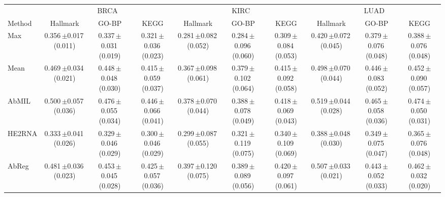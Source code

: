 
\begin{tabular}{lccccccccc}
\toprule
& \multicolumn{3}{c}{BRCA} & \multicolumn{3}{c}{KIRC} & \multicolumn{3}{c}{LUAD}\\
\cmidrule(lr){2-4}\cmidrule(lr){5-7}\cmidrule(lr){8-10}
Method & Hallmark & GO-BP & KEGG & Hallmark & GO-BP & KEGG & Hallmark & GO-BP & KEGG\\
\midrule
Max & 0.356\,{\tiny$\pm$}0.017\,{\tiny(0.011)} & 0.337\,{\tiny$\pm$}0.031\,{\tiny(0.019)} & 0.321\,{\tiny$\pm$}0.036\,{\tiny(0.023)} & 0.281\,{\tiny$\pm$}0.082\,{\tiny(0.052)} & 0.284\,{\tiny$\pm$}0.096\,{\tiny(0.060)} & 0.309\,{\tiny$\pm$}0.084\,{\tiny(0.053)} & 0.420\,{\tiny$\pm$}0.072\,{\tiny(0.045)} & 0.379\,{\tiny$\pm$}0.076\,{\tiny(0.048)} & 0.388\,{\tiny$\pm$}0.076\,{\tiny(0.048)}\\
Mean & 0.469\,{\tiny$\pm$}0.034\,{\tiny(0.021)} & 0.448\,{\tiny$\pm$}0.048\,{\tiny(0.030)} & 0.415\,{\tiny$\pm$}0.059\,{\tiny(0.037)} & 0.367\,{\tiny$\pm$}0.098\,{\tiny(0.061)} & 0.379\,{\tiny$\pm$}0.102\,{\tiny(0.064)} & 0.415\,{\tiny$\pm$}0.092\,{\tiny(0.058)} & 0.498\,{\tiny$\pm$}0.070\,{\tiny(0.044)} & 0.446\,{\tiny$\pm$}0.083\,{\tiny(0.052)} & 0.452\,{\tiny$\pm$}0.090\,{\tiny(0.057)}\\
AbMIL & 0.500\,{\tiny$\pm$}0.057\,{\tiny(0.036)} & 0.476\,{\tiny$\pm$}0.055\,{\tiny(0.034)} & 0.446\,{\tiny$\pm$}0.066\,{\tiny(0.041)} & 0.378\,{\tiny$\pm$}0.070\,{\tiny(0.044)} & 0.388\,{\tiny$\pm$}0.078\,{\tiny(0.049)} & 0.418\,{\tiny$\pm$}0.069\,{\tiny(0.043)} & 0.519\,{\tiny$\pm$}0.044\,{\tiny(0.028)} & 0.465\,{\tiny$\pm$}0.058\,{\tiny(0.036)} & 0.474\,{\tiny$\pm$}0.050\,{\tiny(0.031)}\\
HE2RNA & 0.333\,{\tiny$\pm$}0.041\,{\tiny(0.026)} & 0.329\,{\tiny$\pm$}0.046\,{\tiny(0.029)} & 0.300\,{\tiny$\pm$}0.046\,{\tiny(0.029)} & 0.299\,{\tiny$\pm$}0.087\,{\tiny(0.055)} & 0.321\,{\tiny$\pm$}0.119\,{\tiny(0.075)} & 0.340\,{\tiny$\pm$}0.109\,{\tiny(0.069)} & 0.388\,{\tiny$\pm$}0.048\,{\tiny(0.030)} & 0.349\,{\tiny$\pm$}0.075\,{\tiny(0.047)} & 0.365\,{\tiny$\pm$}0.076\,{\tiny(0.048)}\\
AbReg & 0.481\,{\tiny$\pm$}0.036\,{\tiny(0.023)} & 0.453\,{\tiny$\pm$}0.045\,{\tiny(0.028)} & 0.425\,{\tiny$\pm$}0.057\,{\tiny(0.036)} & 0.397\,{\tiny$\pm$}0.120\,{\tiny(0.075)} & 0.389\,{\tiny$\pm$}0.089\,{\tiny(0.056)} & 0.420\,{\tiny$\pm$}0.097\,{\tiny(0.061)} & 0.507\,{\tiny$\pm$}0.033\,{\tiny(0.021)} & 0.443\,{\tiny$\pm$}0.052\,{\tiny(0.033)} & 0.462\,{\tiny$\pm$}0.032\,{\tiny(0.020)}\\

\end{tabular}
